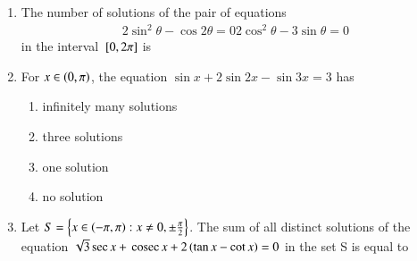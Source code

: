 \begin{enumerate}[label=\thesubsection.\arabic*,ref=\thesubsection.\theenumi]
\hfill{}
\begin{enumerate}
\end{enumerate}
\item The number of solutions of the pair of equations
\begin{align*}
2\sin^2\theta - \cos2\theta = 0
2\cos^2\theta - 3\sin\theta = 0
\end{align*}
in the interval ${}\left[0,2\pi\right]$ is
\hfill{}
\begin{enumerate}
\end{enumerate}
\item For $x \in \left(0,\pi\right)$, the equation $\sin x + 2\sin 2x - \sin 3x = 3$ has
\hfill{}
\begin{enumerate}
\item infinitely many solutions
\item three solutions
\item one solution
\item no solution
\end{enumerate}
\item Let $S = \left\{x \in \left(-\pi,\pi\right) : x \neq 0, \pm \frac{\pi}{2}\right\}$. The sum of all distinct solutions of the equation $\sqrt{3} \sec x + \,\text{cosec}\, x + 2\left(\tan x - \cot x\right) = 0$ in the set S is equal to
\hfill{}
\begin{enumerate}
\begin{multicols}{2}

\end{multicols}
\end{enumerate}
\end{enumerate}
